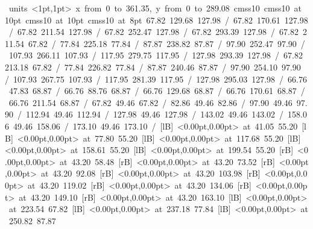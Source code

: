 \hbox{\beginpicture
\setcoordinatesystem units <1pt,1pt>
\setplotarea x from 0 to 361.35, y from 0 to 289.08
\setlinear
\font\picfont cmss10\picfont
\font\picfont cmss10 at 10pt\picfont
\font\picfont cmss10 at 10pt\picfont
\font\picfont cmss10 at 8pt\picfont
\setsolid
{} 67.82 129.68 127.98 /
\setsolid
{} 67.82 170.61 127.98 /
\setsolid
{} 67.82 211.54 127.98 /
\setsolid
{} 67.82 252.47 127.98 /
\setsolid
{} 67.82 293.39 127.98 /
\setsolid
{} 67.82 211.54 67.82 /
\setsolid
{} 77.84 225.18 77.84 /
\setsolid
{} 87.87 238.82 87.87 /
\setsolid
{} 97.90 252.47 97.90 /
\setsolid
{} 107.93 266.11 107.93 /
\setsolid
{} 117.95 279.75 117.95 /
\setsolid
{} 127.98 293.39 127.98 /
\setsolid
{} 67.82 213.18 67.82 /
\setsolid
{} 77.84 226.82 77.84 /
\setsolid
{} 87.87 240.46 87.87 /
\setsolid
{} 97.90 254.10 97.90 /
\setsolid
{} 107.93 267.75 107.93 /
\setsolid
{} 117.95 281.39 117.95 /
\setsolid
{} 127.98 295.03 127.98 /
\setsolid
{} 66.76 47.83 68.87 /
\setsolid
{} 66.76 88.76 68.87 /
\setsolid
{} 66.76 129.68 68.87 /
\setsolid
{} 66.76 170.61 68.87 /
\setsolid
{} 66.76 211.54 68.87 /
\setsolid
{} 67.82 49.46 67.82 /
\setsolid
{} 82.86 49.46 82.86 /
\setsolid
{} 97.90 49.46 97.90 /
\setsolid
{} 112.94 49.46 112.94 /
\setsolid
{} 127.98 49.46 127.98 /
\setsolid
{} 143.02 49.46 143.02 /
\setsolid
{} 158.06 49.46 158.06 /
\setsolid
{} 173.10 49.46 173.10 /
  [lB] <0.00pt,0.00pt> at 41.05 55.20
  [lB] <0.00pt,0.00pt> at 77.80 55.20
  [lB] <0.00pt,0.00pt> at 117.68 55.20
  [lB] <0.00pt,0.00pt> at 158.61 55.20
  [lB] <0.00pt,0.00pt> at 199.54 55.20
 [rB] <0.00pt,0.00pt> at 43.20 58.48
 [rB] <0.00pt,0.00pt> at 43.20 73.52
 [rB] <0.00pt,0.00pt> at 43.20 92.08
 [rB] <0.00pt,0.00pt> at 43.20 103.98
 [rB] <0.00pt,0.00pt> at 43.20 119.02
 [rB] <0.00pt,0.00pt> at 43.20 134.06
 [rB] <0.00pt,0.00pt> at 43.20 149.10
 [rB] <0.00pt,0.00pt> at 43.20 163.10
  [lB] <0.00pt,0.00pt> at 223.54 67.82
  [lB] <0.00pt,0.00pt> at 237.18 77.84
  [lB] <0.00pt,0.00pt> at 250.82 87.87
}
